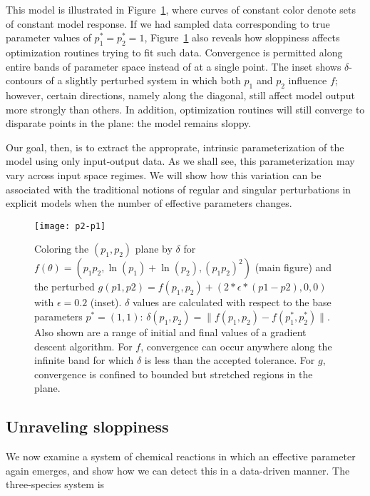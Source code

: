 This model is illustrated in Figure~\ref{fig:non-id}, where curves of
constant color denote sets of constant model response. If we had
sampled data corresponding to true parameter values of
$p_1^* = p_2^* = 1$, Figure~\ref{fig:non-id} also reveals how
sloppiness affects optimization routines trying to fit such
data. Convergence is permitted along entire bands of parameter space
instead of at a single point. The inset shows $\delta$-contours of a
slightly perturbed system in which both $p_1$ and $p_2$ influence $f$;
however, certain directions, namely along the diagonal, still affect
model output more strongly than others. In addition, optimization
routines will still converge to disparate points in the plane: the
model remains sloppy. 

Our goal, then, is to extract the approprate, intrinsic
parameterization of the model using only input-output data. As we
shall see, this parameterization may vary across input space regimes.
We will show how this variation can be associated with the traditional
notions of regular and singular perturbations in explicit models when
the number of effective parameters changes.


\begin{figure}
  \centerline{\texttt{[image: p2-p1]}}
  \caption[Illustration of effects of sloppiness on
  optimization]{Coloring the $(p_1, p_2)$ plane by $\delta$ for
    $f(\theta) = (p_1 p_2 , \ln(p_1) + \ln(p_2) , (p_1 p_2)^2)$ (main
    figure) and the perturbed $g(p1, p2) = f(p_1, p_2) +
    \left(2*\epsilon*(p1 - p2), 0, 0\right)$ with $\epsilon = 0.2$
    (inset). $\delta$ values are calculated with respect to the base
    parameters $p^* = (1, 1)$: $\delta(p_1, p_2) = \| f(p_1, p_2) -
    f(p_1^*, p_2^*)\|$. Also shown are a range of initial and final values of
    a gradient descent algorithm. For $f$, convergence can occur
    anywhere along the infinite band for which $\delta$ is less than
    the accepted tolerance. For $g$, convergence is confined to
    bounded but stretched regions in the plane.
    \label{fig:non-id} }
\end{figure}



\subsection{Unraveling sloppiness} \label{sec:rr} 

We now examine a system of chemical reactions in which an effective
parameter again emerges, and show how we can detect this in a
data-driven manner. The three-species system is

